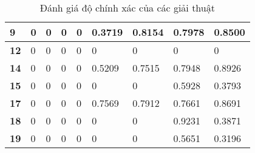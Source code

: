 \begin{table}[H]
\begin{tabular}{|l|ll|ll|ll|ll|}
\textbf{9}     & \multicolumn{1}{l|}{0}                              & 0                           & \multicolumn{1}{l|}{0}                          & 0                       & \multicolumn{1}{l|}{0.3719}                            & 0.8154                        & \multicolumn{1}{l|}{0.7978}                                & 0.8500                             \\ \hline
\textbf{12}    & \multicolumn{1}{l|}{0}                              & 0                           & \multicolumn{1}{l|}{0}                          & 0                       & \multicolumn{1}{l|}{0}                            & 0                        & \multicolumn{1}{l|}{0}                                & 0                             \\ \hline
\textbf{14}    & \multicolumn{1}{l|}{0}                              & 0                           & \multicolumn{1}{l|}{0}                          & 0                       & \multicolumn{1}{l|}{0.5209}                            & 0.7515                        & \multicolumn{1}{l|}{0.7948}                                & 0.8926                             \\ \hline
\textbf{15}    & \multicolumn{1}{l|}{0}                              & 0                           & \multicolumn{1}{l|}{0}                          & 0                       & \multicolumn{1}{l|}{0}                            & 0                        & \multicolumn{1}{l|}{0.5928}                                & 0.3793                             \\ \hline
\textbf{17}    & \multicolumn{1}{l|}{0}                              & 0                           & \multicolumn{1}{l|}{0}                          & 0                       & \multicolumn{1}{l|}{0.7569}                            & 0.7912                        & \multicolumn{1}{l|}{0.7661}                                & 0.8691                             \\ \hline
\textbf{18}    & \multicolumn{1}{l|}{0}                              & 0                           & \multicolumn{1}{l|}{0}                          & 0                       & \multicolumn{1}{l|}{0}                            & 0                        & \multicolumn{1}{l|}{0.9231}                                & 0.3871                             \\ \hline
\textbf{19}    & \multicolumn{1}{l|}{0}                              & 0                           & \multicolumn{1}{l|}{0}                          & 0                       & \multicolumn{1}{l|}{0}                            & 0                        & \multicolumn{1}{l|}{0.5651}                                & 0.3196                             \\ \hline
\end{tabular}
\caption{Đánh giá độ chính xác của các giải thuật}
\end{table}